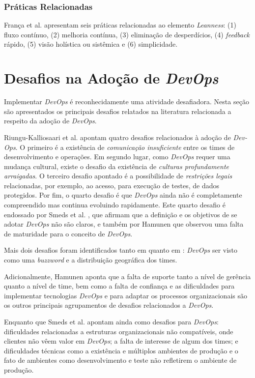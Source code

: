 \subsubsection{Práticas Relacionadas}
França et al. \cite{characterizing_devops} apresentam seis práticas
relacionadas ao elemento \textit{Leanness}: (1) fluxo contínuo, (2) melhoria
contínua, (3) eliminação de desperdícios, (4) \textit{feedback} rápido, (5)
visão holística ou sistêmica e (6) simplicidade.

\section{Desafios na Adoção de \textit{DevOps}}\label{secao_desafios}

Implementar \textit{DevOps} é reconhecidamente uma atividade desafiadora. Nesta
seção são apresentados os principais desafios relatados na literatura
relacionada a respeito da adoção de \textit{DevOps}.

Riungu-Kalliosaari et al. \cite{devops_benefits_challenges} apontam quatro
desafios relacionados à adoção de \textit{Dev-Ops}. O primeiro é a existência
de \emph{comunicação insuficiente} entre os times de desenvolvimento e
operações. Em segundo lugar, como \textit{DevOps} requer
uma mudança cultural, existe o desafio da existência de \emph{culturas
profundamente arraigadas}. O terceiro desafio apontado é a possibilidade de
\emph{restrições legais} relacionadas, por exemplo, ao acesso, para execução de
testes, de dados protegidos. Por fim, o quarto desafio é que \textit{DevOps}
ainda não é completamente compreendido mas continua evoluindo rapidamente. Este
quarto desafio é endossado por Smeds et al. \cite{devops_a_definition}, que
afirmam que a definição e os objetivos de se adotar {\it DevOps} não são claros,
e também por Hamunen \cite{challenges_in_adopting_devops} que observou uma
falta de maturidade para o conceito de {\it DevOps}.

Mais dois desafios foram identificados tanto em \cite{devops_a_definition} quanto em \cite{challenges_in_adopting_devops}:
{\it DevOps} ser visto como uma \textit{buzzword} e a distribuição geográfica
dos times.

Adicionalmente, Hamunen \cite{challenges_in_adopting_devops} aponta que a falta
de suporte tanto a nível de gerência quanto a nível de time, bem como a falta
de confiança e as dificuldades para implementar tecnologias {\it DevOps} e para
adaptar os processos organizacionais são os outros principais agrupamentos de
desafios relacionados a {\it DevOps}.

Enquanto que Smeds et al. apontam ainda como desafios para {\it DevOps}:
dificuldades relacionadas a estruturas organizacionais não compatíveis, onde
clientes não vêem valor em {\it DevOps}; a falta de interesse de algum dos times;
e dificuldades técnicas como a existência e múltiplos ambientes de produção e
o fato de ambientes como desenvolvimento e teste não refletirem o ambiente de
produção.
